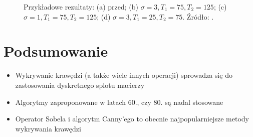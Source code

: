 \documentclass[a4paper,twocolumn,12pt]{article}
\begin{document}
\begin{figure}[!ht]
 \begin{center}
 \end{center}
 \caption{
  Przykładowe rezultaty:
  (a) przed;
  (b) $\sigma = 3, T_1 = 75, T_2 = 125$;
  (c) $\sigma = 1, T_1 = 75, T_2 = 125$;
  (d) $\sigma = 3, T_1 = 25, T_2 = 75$.
  Źródło: \cite{boldak}.
 }
 \label{fig:canny_comparison}
\end{figure}



\section{Podsumowanie}

\begin{itemize}
 \item Wykrywanie krawędzi (a także wiele innych operacji) sprowadza się do zastosowania dyskretnego splotu macierzy
 \item Algorytmy zaproponowane w latach 60., czy 80. są nadal stosowane
 \item Operator Sobela i algorytm Canny’ego to obecnie najpopularniejsze metody wykrywania krawędzi
\end{itemize}
\end{document}
